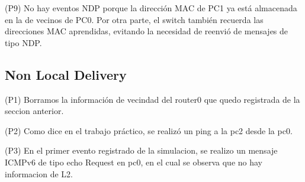 \documentclass[12pt]{article}
\begin{document}
(P9)  No hay eventos NDP porque la dirección MAC de PC1 ya está almacenada en la de vecinos de PC0. Por otra parte, el switch también recuerda las direcciones MAC aprendidas, evitando la necesidad de reenvió de mensajes de tipo NDP.

\subsection{Non Local Delivery}
 
 (P1) Borramos la información de vecindad del router0 que quedo registrada de la seccion anterior.
 
 (P2) Como dice en el trabajo práctico, se realizó un ping a la pc2 desde la pc0.
 
 (P3) En el primer evento registrado de la simulacion, se realizo un mensaje ICMPv6 de tipo echo Request en pc0, en el cual se observa que no hay informacion de L2.
 
\end{document}
